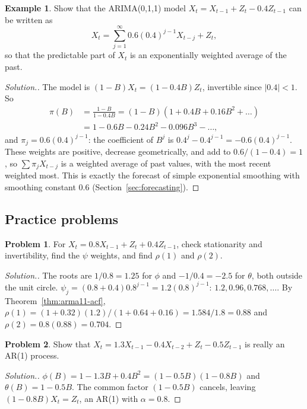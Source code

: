 \documentclass[11pt,a4paper]{article}
\theoremstyle{definition}
\newtheorem{exa}[thm]{Example}
\newtheorem{problemx}{Problem}[subsection]
\newenvironment{problem}{\begin{problemx}}{\end{problemx}}
\newenvironment{solution}
  {\renewcommand{\qedsymbol}{}\begin{proof}[\textit{Solution}.]}
  {\end{proof}}
\begin{document}
\begin{exa}\label{exa:arima011}
Show that the ARIMA(0,1,1) model $X_t = X_{t-1} + Z_t - 0.4Z_{t-1}$ can be written as
\[
X_t = \sum_{j=1}^\infty 0.6(0.4)^{j-1}X_{t-j} + Z_t ,
\]
so that the predictable part of $X_t$ is an exponentially weighted average of the past.
\end{exa}

\begin{solution}
The model is $(1 - B)X_t = (1 - 0.4B)Z_t$, invertible since $|0.4| < 1$. So
\begin{align*}
\pi(B) &= \frac{1 - B}{1 - 0.4B} = (1 - B)(1 + 0.4B + 0.16B^2 + \dots) \\
&= 1 - 0.6B - 0.24B^2 - 0.096B^3 - \dots ,
\end{align*}
and $\pi_j = 0.6(0.4)^{j-1}$: the coefficient of $B^j$ is $0.4^j - 0.4^{j-1} = -0.6(0.4)^{j-1}$. These weights are positive, decrease geometrically,
and add to $0.6/(1 - 0.4) = 1$, so $\sum\pi_jX_{t-j}$ is a weighted average of past values, with the most recent weighted most. This is
exactly the forecast of simple exponential smoothing with smoothing constant $0.6$ (Section~\ref{sec:forecasting}).
\end{solution}

\subsection{Practice problems}
\begin{problem}\label{prob:arma11-08}
For $X_t = 0.8X_{t-1} + Z_t + 0.4Z_{t-1}$, check stationarity and invertibility, find the $\psi$ weights, and find $\rho(1)$ and $\rho(2)$.
\end{problem}

\begin{solution}
The roots are $1/0.8 = 1.25$ for $\phi$ and $-1/0.4 = -2.5$ for $\theta$, both outside the unit circle. $\psi_j = (0.8 + 0.4)0.8^{j-1} = 1.2(0.8)^{j-1}$:
$1.2, 0.96, 0.768, \dots$. By Theorem~\ref{thm:arma11-acf}, $\rho(1) = (1 + 0.32)(1.2)/(1 + 0.64 + 0.16) = 1.584/1.8 = 0.88$ and $\rho(2) = 0.8(0.88) = 0.704$.
\end{solution}

\begin{problem}\label{prob:redundant}
Show that $X_t = 1.3X_{t-1} - 0.4X_{t-2} + Z_t - 0.5Z_{t-1}$ is really an AR(1) process.
\end{problem}

\begin{solution}
$\phi(B) = 1 - 1.3B + 0.4B^2 = (1 - 0.5B)(1 - 0.8B)$ and $\theta(B) = 1 - 0.5B$. The common factor $(1 - 0.5B)$ cancels, leaving
$(1 - 0.8B)X_t = Z_t$, an AR(1) with $\alpha = 0.8$.
\end{solution}
\end{document}
